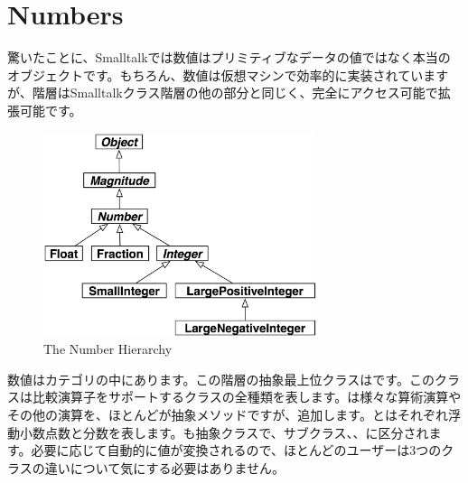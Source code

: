 \documentclass[a4paper,10pt,twoside]{book}
\begin{document}
\section{Numbers}
驚いたことに、Smalltalkでは数値はプリミティブなデータの値ではなく本当のオブジェクトです。もちろん、数値は仮想マシンで効率的に実装されていますが、階層はSmalltalkクラス階層の他の部分と同じく、完全にアクセス可能で拡張可能です。

\begin{figure}[ht]
\centerline {\includegraphics[width=8cm]{NumberHierarchy}}
\caption{The Number Hierarchy }
\end{figure}

数値はカテゴリの中にあります。この階層の抽象最上位クラスはです。このクラスは比較演算子をサポートするクラスの全種類を表します。は様々な算術演算やその他の演算を、ほとんどが抽象メソッドですが、追加します。とはそれぞれ浮動小数点数と分数を表します。も抽象クラスで、サブクラス、、に区分されます。必要に応じて自動的に値が変換されるので、ほとんどのユーザーは3つのクラスの違いについて気にする必要はありません。
\end{document}
